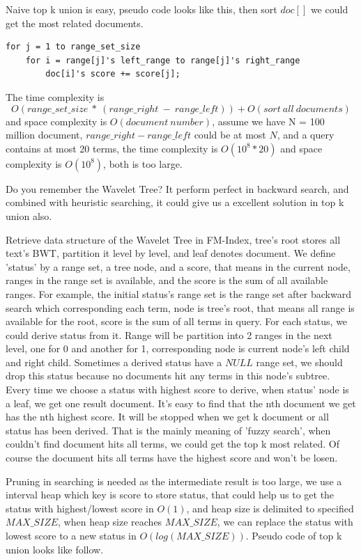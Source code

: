 Naive top k union is easy, pseudo code looks like this, then sort \(doc[]\) we could get the most related documents.

\begin{scriptsize} \begin{verbatim}
for j = 1 to range_set_size
    for i = range[j]'s left_range to range[j]'s right_range
        doc[i]'s score += score[j];
\end{verbatim} \end{scriptsize}

The time complexity is \[O(range\_set\_size\ *\ (range\_right\ -\ range\_left)) + O(sort\ all\ documents)\] and space complexity is \(O(document\ number)\), assume we have N = 100 million document, \(range\_right - range\_left\) could be at most \(N\), and a query contains at most 20 terms, the time complexity is \(O(10^8 * 20)\) and space complexity is \(O(10^8)\), both is too large.

Do you remember the Wavelet Tree? It perform perfect in backward search, and combined with heuristic searching, it could give us a excellent solution in top k union also.

Retrieve data structure of the Wavelet Tree in FM-Index, tree's root stores all text's BWT, partition it level by level, and leaf denotes document.
We define 'status' by a range set, a tree node, and a score, that means in the current node, ranges in the range set is available, and the score is the sum of all available ranges. For example, the initial status's range set is the range set after backward search which corresponding each term, node is tree's root, that means all range is available for the root, score is the sum of all terms in query.
For each status, we could derive status from it. Range will be partition into 2 ranges in the next level, one for 0 and another for 1, corresponding node is current node's left child and right child. Sometimes a derived status have a \(NULL\) range set, we should drop this status because no documents hit any terms in this node's subtree.
Every time we choose a status with highest score to derive, when status' node is a leaf, we get one result document. It's easy to find that the nth document we get has the nth highest score. It will be stopped when we get k document or all status has been derived. That is the mainly meaning of 'fuzzy search', when couldn't find document hits all terms, we could get the top k most related. Of course the document hits all terms have the highest score and won't be losen.

Pruning in searching is needed as the intermediate result is too large, we use a interval heap which key is score to store status, that could help us to get the status with highest/lowest score in \(O(1)\), and heap size is delimited to specified \(MAX\_SIZE\), when heap size reaches \(MAX\_SIZE\), we can replace the status with lowest score to a new status in \(O(log(MAX\_SIZE))\).
Pseudo code of top k union looks like follow.

